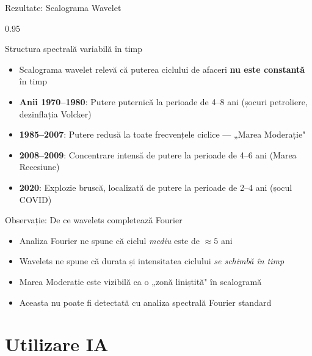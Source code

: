 \documentclass[9pt, aspectratio=169, t]{beamer}
\begin{document}
\begin{frame}{Rezultate: Scalograma Wavelet}
    \begin{cminipage}{0.95\textwidth}
    \vspace{-2mm}
    \begin{block}{Structura spectrală variabilă în timp}
        {\small
        \begin{itemize}\setlength{\itemsep}{0pt}
            \item Scalograma wavelet relevă că puterea ciclului de afaceri \textbf{nu este constantă} în timp
            \item \textbf{Anii 1970--1980}: Putere puternică la perioade de 4--8 ani (șocuri petroliere, dezinflația Volcker)
            \item \textbf{1985--2007}: Putere redusă la toate frecvențele ciclice --- „Marea Moderație"
            \item \textbf{2008--2009}: Concentrare intensă de putere la perioade de 4--6 ani (Marea Recesiune)
            \item \textbf{2020}: Explozie bruscă, localizată de putere la perioade de 2--4 ani (șocul COVID)
        \end{itemize}
        }
    \end{block}
    \vspace{-2mm}
    \begin{alertblock}{Observație: De ce wavelets completează Fourier}
        \begin{itemize}\setlength{\itemsep}{0pt}
            \item Analiza Fourier ne spune că ciclul \textit{mediu} este de $\approx 5$ ani
            \item Wavelets ne spune că durata și intensitatea ciclului \textit{se schimbă în timp}
            \item Marea Moderație este vizibilă ca o „zonă liniștită" în scalogramă
            \item Aceasta nu poate fi detectată cu analiza spectrală Fourier standard
        \end{itemize}
    \end{alertblock}
    \end{cminipage}
\end{frame}

\section{Utilizare IA}
\end{document}
